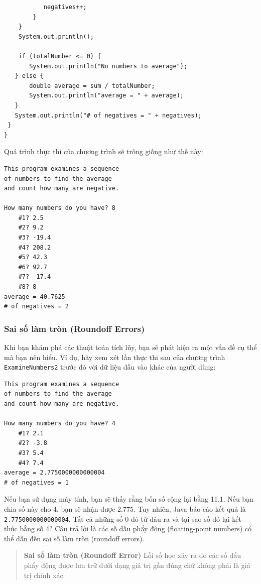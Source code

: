 \begin{verbatim}
           negatives++;
        }
    }
    System.out.println();

    if (totalNumber <= 0) {
       System.out.println("No numbers to average");
   } else {
       double average = sum / totalNumber;
       System.out.println("average = " + average);
   }
   System.out.println("# of negatives = " + negatives);
 }
}
\end{verbatim}

Quá trình thực thi của chương trình sẽ trông giống như thế này:

\begin{verbatim}
This program examines a sequence 
of numbers to find the average 
and count how many are negative. 
 
How many numbers do you have? 8  
    #1? 2.5  
    #2? 9.2  
    #3? -19.4  
    #4? 208.2  
    #5? 42.3  
    #6? 92.7  
    #7? -17.4  
    #8? 8  
average = 40.7625 
# of negatives = 2
\end{verbatim}

\subsubsection{Sai số làm tròn (Roundoff
Errors)}\label{sai-sux1ed1-luxe0m-truxf2n-roundoff-errors}

Khi bạn khám phá các thuật toán tích lũy, bạn sẽ phát hiện ra một vấn đề
cụ thể mà bạn nên hiểu. Ví dụ, hãy xem xét lần thực thi sau của chương
trình \texttt{ExamineNumbers2} trước đó với dữ liệu đầu vào khác của
người dùng:

\begin{verbatim}
This program examines a sequence 
of numbers to find the average 
and count how many are negative. 
 
How many numbers do you have? 4 
    #1? 2.1  
    #2? -3.8  
    #3? 5.4  
    #4? 7.4  
average = 2.7750000000000004 
# of negatives = 1
\end{verbatim}

Nếu bạn sử dụng máy tính, bạn sẽ thấy rằng bốn số cộng lại bằng 11.1.
Nếu bạn chia số này cho 4, bạn sẽ nhận được 2.775. Tuy nhiên, Java báo
cáo kết quả là \texttt{2.7750000000000004}. Tất cả những số 0 đó từ đâu
ra và tại sao số đó lại kết thúc bằng số 4? Câu trả lời là các số dấu
phẩy động (floating-point numbers) có thể dẫn đến sai số làm tròn
(roundoff errors).

\begin{quote}
\textbf{Sai số làm tròn (Roundoff Error)} Lỗi số học xảy ra do các số
dấu phẩy động được lưu trữ dưới dạng giá trị gần đúng chứ không phải là
giá trị chính xác.
\end{quote}

